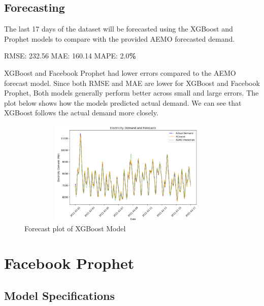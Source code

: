 \documentclass[mstat,12pt]{unswthesis}
\newenvironment{Shaded}{\begin{snugshade}}{\end{snugshade}}
\newcommand{\FloatTok}[1]{\textcolor[rgb]{0.00,0.00,0.81}{#1}}
\newcommand{\NormalTok}[1]{#1}
\newcommand{\OperatorTok}[1]{\textcolor[rgb]{0.81,0.36,0.00}{\textbf{#1}}}
\begin{document}
\subsection{Forecasting}\label{forecasting}

The last 17 days of the dataset will be forecasted using the XGBoost and
Prophet models to compare with the provided AEMO forecasted demand.

\begin{Shaded}
\begin{Highlighting}[]
\NormalTok{RMSE: }\FloatTok{232.56}
\NormalTok{MAE: }\FloatTok{160.14}
\NormalTok{MAPE: }\FloatTok{2.0}\OperatorTok{\%}
\end{Highlighting}
\end{Shaded}

XGBoost and Facebook Prophet had lower errors compared to the AEMO
forecast model. Since both RMSE and MAE are lower for XGBoost and
Facebook Prophet, Both models generally perform better across small and
large errors. The plot below shows how the models predicted actual
demand. We can see that XGBoost follows the actual demand more closely.

\begin{figure}[H]
\centering
\includegraphics[width=0.95\textwidth, height=5cm]{forecastplot.png}
\caption{Forecast plot of XGBoost Model}\label{forecastplot}
\end{figure}

\section{Facebook Prophet}\label{facebook-prophet}

\subsection{Model Specifications}\label{model-specifications-1}
\end{document}

